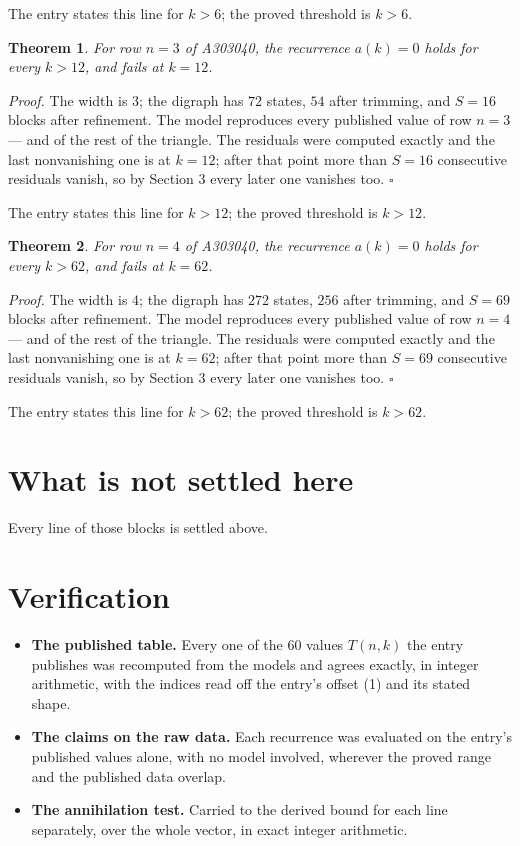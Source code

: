\documentclass[11pt]{article}
\newtheorem{theorem}{Theorem}
\theoremstyle{definition}
\begin{document}
The entry states this line for $k > 6$; the proved threshold is $k > 6$.

\begin{theorem} For row $n = 3$ of A303040, the recurrence $a(k) = 0$ holds for every $k > 12$, and fails at $k = 12$.\end{theorem}

{\itshape Proof.} The width is $3$; the digraph has $72$ states, $54$ after trimming, and $S = 16$ blocks after refinement. The model reproduces every published value of row $n = 3$ --- and of the rest of the triangle. The residuals were computed exactly and the last nonvanishing one is at $k = 12$; after that point more than $S = 16$ consecutive residuals vanish, so by Section 3 every later one vanishes too. $\square$

The entry states this line for $k > 12$; the proved threshold is $k > 12$.

\begin{theorem} For row $n = 4$ of A303040, the recurrence $a(k) = 0$ holds for every $k > 62$, and fails at $k = 62$.\end{theorem}

{\itshape Proof.} The width is $4$; the digraph has $272$ states, $256$ after trimming, and $S = 69$ blocks after refinement. The model reproduces every published value of row $n = 4$ --- and of the rest of the triangle. The residuals were computed exactly and the last nonvanishing one is at $k = 62$; after that point more than $S = 69$ consecutive residuals vanish, so by Section 3 every later one vanishes too. $\square$

The entry states this line for $k > 62$; the proved threshold is $k > 62$.

\section{What is not settled here}

Every line of those blocks is settled above.

\section{Verification}

\begin{itemize}

\item {\bfseries The published table.} Every one of the 60 values $T(n,k)$ the entry publishes was recomputed from the models and agrees exactly, in integer arithmetic, with the indices read off the entry's offset (1) and its stated shape.

\item {\bfseries The claims on the raw data.} Each recurrence was evaluated on the entry's published values alone, with no model involved, wherever the proved range and the published data overlap.

\item {\bfseries The annihilation test.} Carried to the derived bound for each line separately, over the whole vector, in exact integer arithmetic.

\end{itemize}
\end{document}
